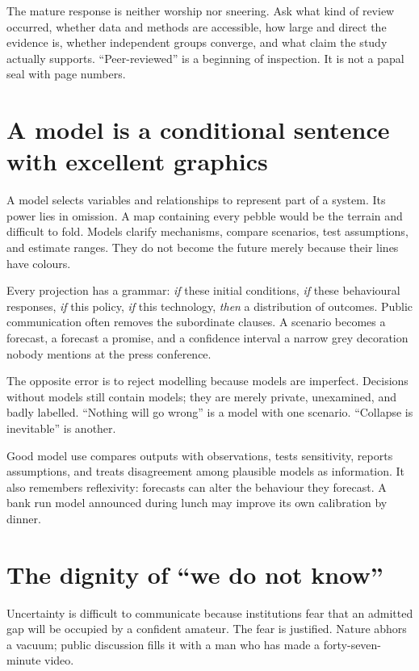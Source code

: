 \documentclass[12pt,a4paper]{book}
\begin{document}
The mature response is neither worship nor sneering.  Ask what kind of review
occurred, whether data and methods are accessible, how large and direct the
evidence is, whether independent groups converge, and what claim the study
actually supports.  ``Peer-reviewed'' is a beginning of inspection.  It is not
a papal seal with page numbers.

\section{A model is a conditional sentence with excellent graphics}

A model selects variables and relationships to represent part of a system.
Its power lies in omission.  A map containing every pebble would be the terrain
and difficult to fold.  Models clarify mechanisms, compare scenarios, test
assumptions, and estimate ranges.  They do not become the future merely because
their lines have colours.

Every projection has a grammar: \emph{if} these initial conditions, \emph{if}
these behavioural responses, \emph{if} this policy, \emph{if} this technology,
\emph{then} a distribution of outcomes.  Public communication often removes
the subordinate clauses.  A scenario becomes a forecast, a forecast a promise,
and a confidence interval a narrow grey decoration nobody mentions at the
press conference.

The opposite error is to reject modelling because models are imperfect.
Decisions without models still contain models; they are merely private,
unexamined, and badly labelled.  ``Nothing will go wrong'' is a model with one
scenario.  ``Collapse is inevitable'' is another.

Good model use compares outputs with observations, tests sensitivity, reports
assumptions, and treats disagreement among plausible models as information.
It also remembers reflexivity: forecasts can alter the behaviour they forecast.
A bank run model announced during lunch may improve its own calibration by
dinner.

\section{The dignity of ``we do not know''}

Uncertainty is difficult to communicate because institutions fear that an
admitted gap will be occupied by a confident amateur.  The fear is justified.
Nature abhors a vacuum; public discussion fills it with a man who has made a
forty-seven-minute video.
\end{document}
